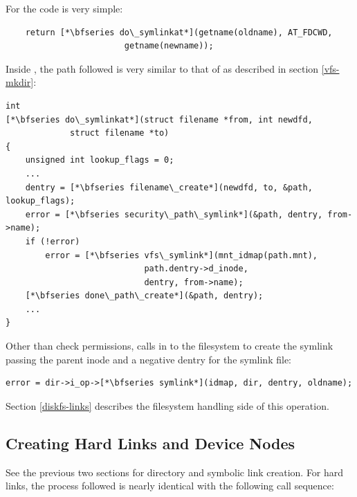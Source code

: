 \noindent
For  the code is very simple:

\begin{lstlisting}
    return [*\bfseries do\_symlinkat*](getname(oldname), AT_FDCWD, 
                        getname(newname));
\end{lstlisting}

\noindent
Inside , the path followed is very similar to that of  as described in section \ref{vfs-mkdir}:

\begin{lstlisting}
int 
[*\bfseries do\_symlinkat*](struct filename *from, int newdfd, 
             struct filename *to)
{                 
    unsigned int lookup_flags = 0;     
    ...
    dentry = [*\bfseries filename\_create*](newdfd, to, &path, lookup_flags);
    error = [*\bfseries security\_path\_symlink*](&path, dentry, from->name);
    if (!error)
        error = [*\bfseries vfs\_symlink*](mnt_idmap(path.mnt), 
                            path.dentry->d_inode,
                            dentry, from->name);
    [*\bfseries done\_path\_create*](&path, dentry);
    ...
}
\end{lstlisting}

\noindent
Other than check permissions,  calls in to the filesystem to create the symlink passing the parent inode and a negative dentry for the symlink file:

\begin{lstlisting}
error = dir->i_op->[*\bfseries symlink*](idmap, dir, dentry, oldname);
\end{lstlisting}

\noindent
Section \ref{diskfs-links} describes the filesystem handling side of this operation.


\subsection{Creating Hard Links and Device Nodes}

See the previous two sections for directory and symbolic link creation. For hard links, the process followed is nearly identical with the following call sequence:


